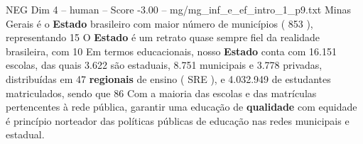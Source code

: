 \begin{textsample}{NEG Dim 4 – human – Score -3.00 – mg/mg\_inf\_e\_ef\_intro\_1\_p9.txt}  \label{ex:f4_neg_002}
Minas Gerais é o \textbf{Estado} brasileiro com maior número de municípios ( 853 ), representando 15 %
O \textbf{Estado} é um retrato quase sempre fiel da realidade brasileira, com 10 %
Em termos educacionais, nosso \textbf{Estado} conta com 16.151 escolas, das quais 3.622 são estaduais, 8.751 municipais e 3.778 privadas, distribuídas em 47 \textbf{regionais} de ensino ( SRE ), e 4.032.949 de estudantes matriculados, sendo que 86 %
Com a maioria das escolas e das matrículas pertencentes à rede pública, garantir uma educação de \textbf{qualidade} com equidade é princípio norteador das políticas públicas de educação nas redes municipais e estadual.

\end{textsample}
